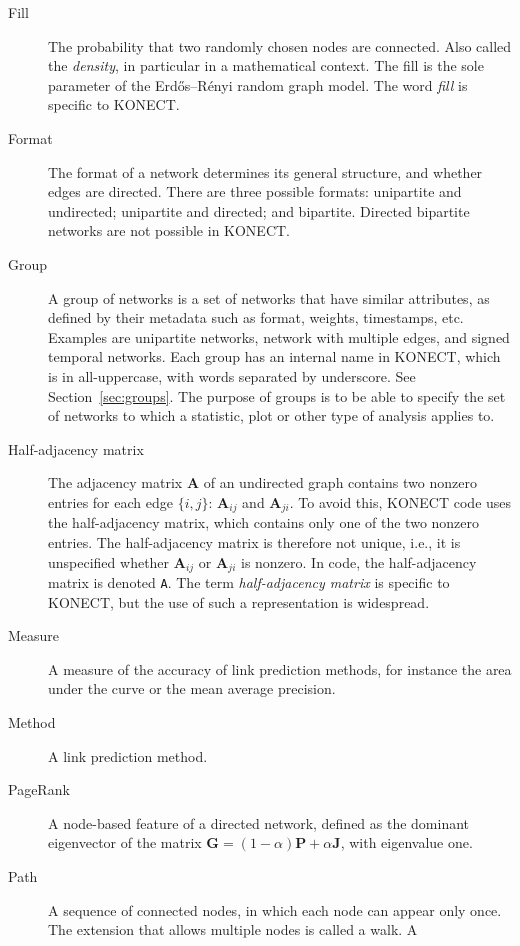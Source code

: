 \documentclass{article}
\begin{document}
\begin{description}
  \item[Fill] The probability that two randomly chosen nodes are
    connected.  Also called the \emph{density}, in particular in a
    mathematical context.  The fill is the sole parameter of the
    Erdős--Rényi random graph model.  The word \emph{fill} is specific
    to KONECT. 
  \item[Format] 
    The format of a network determines its general structure, and
    whether edges are directed.  There are three possible formats:
    unipartite and undirected; unipartite and directed; and bipartite.
    Directed bipartite networks are not possible in KONECT.  
  \item[Group]
    A group of networks is a set of networks that have similar
    attributes, as defined by their metadata such as format, weights,
    timestamps, etc.  Examples are unipartite networks, network with
    multiple edges, and signed temporal networks.  Each group has an
    internal name in KONECT, which is in all-uppercase, with words
    separated by underscore.  See Section~\ref{sec:groups}.  The purpose
    of groups is to be able to specify the set of networks to which a
    statistic, plot or other type of analysis applies to.
  \item[Half-adjacency matrix]
    The adjacency matrix $\mathbf A$ of an undirected graph contains two
    nonzero entries for each edge $\{i,j\}$:  $\mathbf A_{ij}$ and
    $\mathbf A_{ji}$.  To avoid this, KONECT code uses the
    half-adjacency matrix, which contains only one of the two nonzero
    entries.  The half-adjacency matrix is therefore not unique, i.e.,
    it is unspecified whether $\mathbf A_{ij}$ or $\mathbf A_{ji}$ is nonzero.  In
    code, the half-adjacency matrix is denoted \texttt{A}.  The term
    \emph{half-adjacency matrix} is specific to KONECT, but the use of
    such a representation is widespread. 
  \item[Measure]
    A measure of the accuracy of link prediction methods, for instance
    the area under the curve or the mean average precision.  
  \item[Method]
    A link prediction method. 
  \item[PageRank] 
    A node-based feature of a directed network, defined as the dominant
    eigenvector of the matrix $\mathbf G = (1-\alpha) \mathbf P +
    \alpha\mathbf J$, with eigenvalue one. 
  \item[Path]
    A sequence of connected nodes, in which each node can appear only
    once.  The extension that allows multiple nodes is called a walk.  A

\end{description}
\end{document}
